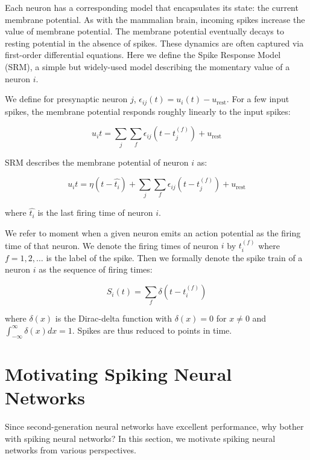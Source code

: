 \documentclass[fyp]{socreport}
\begin{document}
Each neuron has a corresponding model that encapsulates its state: the current
membrane potential. As with the mammalian brain, incoming spikes increase the
value of membrane potential. The membrane potential eventually decays to resting
potential in the absence of spikes. These dynamics are often captured via
first-order differential equations. Here we define the Spike Response Model
(SRM), a simple but widely-used model describing the momentary value of a neuron
\(i\).

We define for presynaptic neuron \(j\),
\(\epsilon_{ij}(t) = u_{i}(t) - u_{\text{rest}}\). For a few input spikes, the
membrane potential responds roughly linearly to the input spikes:

\begin{equation} u_i{t} = \sum_{j}\sum_{f} \epsilon_{ij}(t - t_j^{(f)}) + u_{\text{rest}}
\end{equation}

SRM describes the membrane potential of neuron \(i\) as:

\begin{equation} u_i{t} = \eta (t - \hat{t_i}) + \sum_{j}\sum_{f} \epsilon_{ij}(t - t_j^{(f)}) + u_{\text{rest}}
\end{equation}

where \(\hat{t_i}\) is the last firing time of neuron \(i\).

We refer to moment when a given neuron emits an action potential as the firing
time of that neuron. We denote the firing times of neuron \(i\) by \(t_i^{(f)}\)
where \(f = 1,2,\dots\) is the label of the spike.  Then we formally denote the
spike train of a neuron \(i\) as the sequence of firing times:

\begin{equation} S_i(t) = \sum_{f} \delta\left( t - t_i^{(f)} \right)
\end{equation}

where \(\delta(x)\) is the Dirac-delta function with \(\delta(x) = 0\) for
\(x \ne 0\) and \(\int_{-\infty}^{\infty} \delta(x)dx = 1\). Spikes are thus
reduced to points in time.

\section{Motivating Spiking Neural Networks\label{sec:motiv-spik-neur}}

Since second-generation neural networks have excellent performance, why bother
with spiking neural networks? In this section, we motivate spiking neural
networks from various perspectives.
\end{document}
